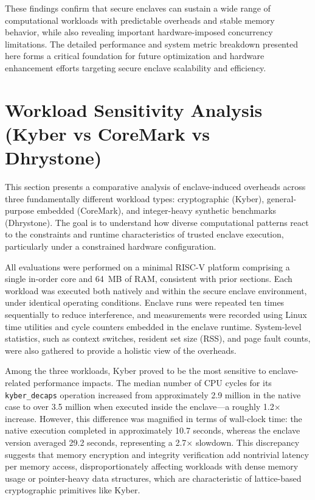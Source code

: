 These findings confirm that secure enclaves can sustain a wide range of computational workloads with predictable overheads and stable memory behavior, while also revealing important hardware-imposed concurrency limitations. The detailed performance and system metric breakdown presented here forms a critical foundation for future optimization and hardware enhancement efforts targeting secure enclave scalability and efficiency.

\section{Workload Sensitivity Analysis (Kyber vs CoreMark vs Dhrystone)}
\label{sec:workload-sensitivity}

This section presents a comparative analysis of enclave-induced overheads across three fundamentally different workload types: cryptographic (Kyber), general-purpose embedded (CoreMark), and integer-heavy synthetic benchmarks (Dhrystone). The goal is to understand how diverse computational patterns react to the constraints and runtime characteristics of trusted enclave execution, particularly under a constrained hardware configuration.

All evaluations were performed on a minimal RISC-V platform comprising a single in-order core and 64~MB of RAM, consistent with prior sections. Each workload was executed both natively and within the secure enclave environment, under identical operating conditions. Enclave runs were repeated ten times sequentially to reduce interference, and measurements were recorded using Linux time utilities and cycle counters embedded in the enclave runtime. System-level statistics, such as context switches, resident set size (RSS), and page fault counts, were also gathered to provide a holistic view of the overheads.

Among the three workloads, Kyber proved to be the most sensitive to enclave-related performance impacts. The median number of CPU cycles for its \texttt{kyber\_decaps} operation increased from approximately 2.9 million in the native case to over 3.5 million when executed inside the enclave—a roughly 1.2$\times$ increase. However, this difference was magnified in terms of wall-clock time: the native execution completed in approximately 10.7 seconds, whereas the enclave version averaged 29.2 seconds, representing a 2.7$\times$ slowdown. This discrepancy suggests that memory encryption and integrity verification add nontrivial latency per memory access, disproportionately affecting workloads with dense memory usage or pointer-heavy data structures, which are characteristic of lattice-based cryptographic primitives like Kyber.

